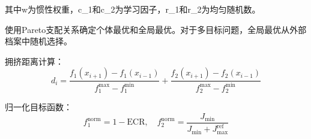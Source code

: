 其中w为惯性权重，c\_1和c\_2为学习因子，r\_1和r\_2为均匀随机数。

使用Pareto支配关系确定个体最优和全局最优。对于多目标问题，全局最优从外部档案中随机选择。

拥挤距离计算：
\begin{equation}
    d_i = \frac{f_1(x_{i+1}) - f_1(x_{i-1})}{f_1^{\max} - f_1^{\min}} + \frac{f_2(x_{i+1}) - f_2(x_{i-1})}{f_2^{\max} - f_2^{\min}}
\end{equation}

归一化目标函数：
\begin{equation}
    f_1^{\text{norm}} = 1 - \text{ECR}, \quad f_2^{\text{norm}} = \frac{J_{\text{min}}}{J_{\text{min}} + J_{\text{max}}^{\text{ref}}}
\end{equation}